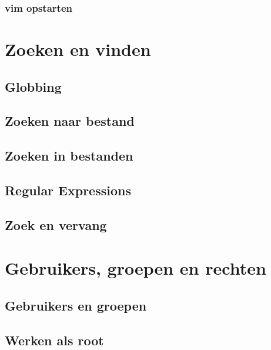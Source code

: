 \documentclass[a4paper,12pt,twoside,openright,titlepage]{book}
\begin{document}
\subsection{vim opstarten}






\chapter{Zoeken en vinden}\label{zoekenenvinden}

\section{Globbing}

\section{Zoeken naar bestand}


\section{Zoeken in bestanden}


\section{Regular Expressions}

\section{Zoek en vervang}


\chapter{Gebruikers, groepen en rechten}

\section{Gebruikers en groepen}



\section{Werken als root}

\end{document}
